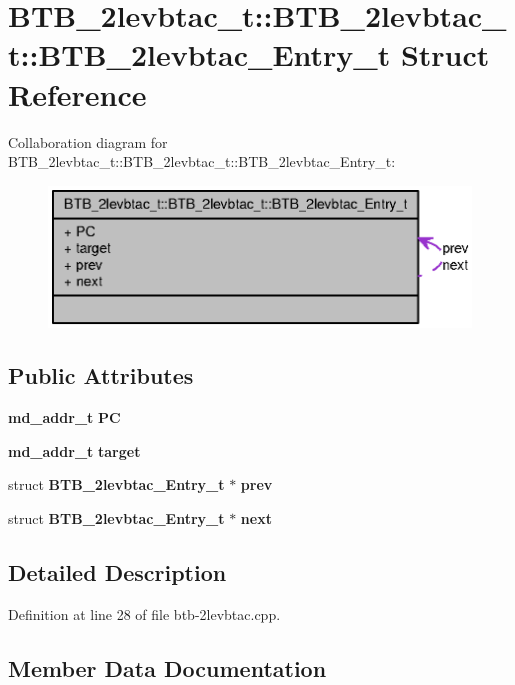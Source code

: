 \section{BTB\_\-2levbtac\_\-t::BTB\_\-2levbtac\_\-t::BTB\_\-2levbtac\_\-Entry\_\-t Struct Reference}
\label{structBTB__2levbtac__t_1_1BTB__2levbtac__Entry__t}
Collaboration diagram for BTB\_\-2levbtac\_\-t::BTB\_\-2levbtac\_\-t::BTB\_\-2levbtac\_\-Entry\_\-t:\nopagebreak
\begin{figure}[H]
\begin{center}
\leavevmode
\includegraphics[width=347pt]{structBTB__2levbtac__t_1_1BTB__2levbtac__Entry__t__coll__graph}
\end{center}
\end{figure}
\subsection*{Public Attributes}
\begin{CompactItemize}
\item 
{\bf md\_\-addr\_\-t} {\bf PC}
\item 
{\bf md\_\-addr\_\-t} {\bf target}
\item 
struct {\bf BTB\_\-2levbtac\_\-Entry\_\-t} $\ast$ {\bf prev}
\item 
struct {\bf BTB\_\-2levbtac\_\-Entry\_\-t} $\ast$ {\bf next}
\end{CompactItemize}


\subsection{Detailed Description}


Definition at line 28 of file btb-2levbtac.cpp.

\subsection{Member Data Documentation}
